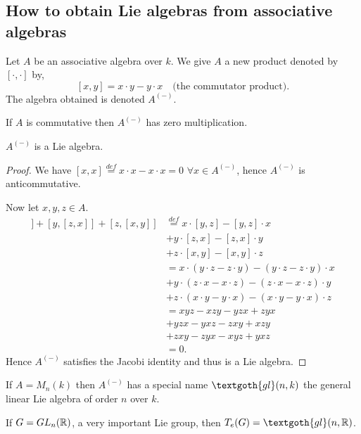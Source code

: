 \subsection{How to obtain Lie algebras from associative algebras}

Let $A$ be an associative algebra over $k$. We give $A$ a new product denoted by $[\cdot,\cdot]$ by,
\[
  [x,y] = x \cdot y - y \cdot x \quad \text{(the commutator product)}.
\]
The algebra obtained is denoted $A^{(-)}$.

\begin{remark}
  If $A$ is commutative then $A^{(-)}$ has zero multiplication.
\end{remark}

\begin{proposition}
  $A^{(-)}$ is a Lie algebra.
\end{proposition}

\begin{proof}
  We have $[x,x] \overset{def}{=} x \cdot x - x \cdot x = 0$ $\forall x \in A^{(-)}$, hence $A^{(-)}$ is anticommutative.

  Now let $x,y,z \in A$.
  \begin{align*}
    [x,[y,z]] + [y,[z,x]] + [z,[x,y]] &\overset{def}{=} x \cdot [y,z] - [y,z] \cdot x\\
    &+ y \cdot [z,x] - [z,x] \cdot y\\
    &+ z \cdot [x,y] - [x,y] \cdot z\\
    &= x \cdot (y \cdot z - z \cdot y) - (y \cdot z - z \cdot y) \cdot x\\
    &+ y \cdot (z \cdot x - x \cdot z) - (z \cdot x - x \cdot z) \cdot y\\
    &+ z \cdot (x \cdot y - y \cdot x) - (x \cdot y - y \cdot x) \cdot z\\
    &= xyz - xzy - yzx + zyx\\
    &+ yzx - yxz - zxy + xzy\\
    &+ zxy - zyx - xyz + yxz\\
    &= 0.
  \end{align*}
  Hence $A^{(-)}$ satisfies the Jacobi identity and thus is a Lie algebra.
\end{proof}

If $A = M_n(k)$ then $A^{(-)}$ has a special name $\textgoth{gl}(n, k)$ the general linear Lie algebra of order $n$ over $k$.

\begin{remark}
  If $G=GL_n(\mathbb{R})$, a very important Lie group, then $T_e(G) = \textgoth{gl}(n, \R)$.
\end{remark}

